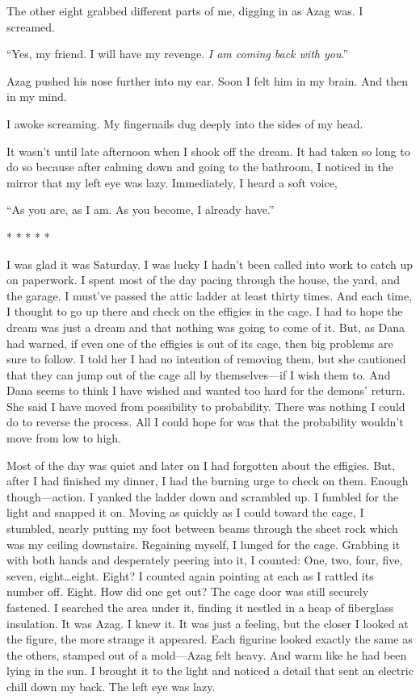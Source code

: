\documentclass[
]{article}
\begin{document}
The other eight grabbed different parts of me, digging in as Azag was. I
screamed.

``Yes, my friend. I will have my revenge. \emph{I am coming back with
you}.''

Azag pushed his nose further into my ear. Soon I felt him in my brain.
And then in my mind.

I awoke screaming. My fingernails dug deeply into the sides of my head.

It wasn't until late afternoon when I shook off the dream. It had taken
so long to do so because after calming down and going to the bathroom, I
noticed in the mirror that my left eye was lazy. Immediately, I heard a
soft voice,

``As you are, as I am. As you become, I already have.''

* * * * *

I was glad it was Saturday. I was lucky I hadn't been called into work
to catch up on paperwork. I spent most of the day pacing through the
house, the yard, and the garage. I must've passed the attic ladder at
least thirty times. And each time, I thought to go up there and check on
the effigies in the cage. I had to hope the dream was just a dream and
that nothing was going to come of it. But, as Dana had warned, if even
one of the effigies is out of its cage, then big problems are sure to
follow. I told her I had no intention of removing them, but she
cautioned that they can jump out of the cage all by themselves---if I
wish them to. And Dana seems to think I have wished and wanted too hard
for the demons' return. She said I have moved from possibility to
probability. There was nothing I could do to reverse the process. All I
could hope for was that the probability wouldn't move from low to high.

Most of the day was quiet and later on I had forgotten about the
effigies. But, after I had finished my dinner, I had the burning urge to
check on them. Enough though---action. I yanked the ladder down and
scrambled up. I fumbled for the light and snapped it on. Moving as
quickly as I could toward the cage, I stumbled, nearly putting my foot
between beams through the sheet rock which was my ceiling downstairs.
Regaining myself, I lunged for the cage. Grabbing it with both hands and
desperately peering into it, I counted: One, two, four, five, seven,
eight\ldots eight. Eight? I counted again pointing at each as I rattled
its number off. Eight. How did one get out? The cage door was still
securely fastened. I searched the area under it, finding it nestled in a
heap of fiberglass insulation. It was Azag. I knew it. It was just a
feeling, but the closer I looked at the figure, the more strange it
appeared. Each figurine looked exactly the same as the others, stamped
out of a mold---Azag felt heavy. And warm like he had been lying in the
sun. I brought it to the light and noticed a detail that sent an
electric chill down my back. The left eye was lazy.
\end{document}
